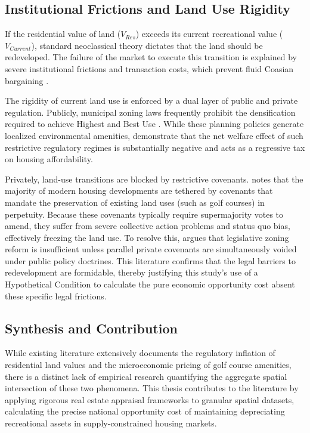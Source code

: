 \documentclass[10pt, letterpaper]{article}
\begin{document}
\subsection{Institutional Frictions and Land Use Rigidity}
If the residential value of land ($V_{Res}$) exceeds its current recreational value ($V_{Current}$), standard neoclassical theory dictates that the land should be redeveloped. The failure of the market to execute this transition is explained by severe institutional frictions and transaction costs, which prevent fluid Coasian bargaining \parencite{Coase1960}. 

The rigidity of current land use is enforced by a dual layer of public and private regulation. Publicly, municipal zoning laws frequently prohibit the densification required to achieve Highest and Best Use \parencite{Fischel2015}. While these planning policies generate localized environmental amenities, \textcite{Cheshire2002} demonstrate that the net welfare effect of such restrictive regulatory regimes is substantially negative and acts as a regressive tax on housing affordability. 

Privately, land-use transitions are blocked by restrictive covenants. \textcite{Ellickson2022} notes that the majority of modern housing developments are tethered by covenants that mandate the preservation of existing land uses (such as golf courses) in perpetuity. Because these covenants typically require supermajority votes to amend, they suffer from severe collective action problems and status quo bias, effectively freezing the land use. To resolve this, \textcite{Korngold2024} argues that legislative zoning reform is insufficient unless parallel private covenants are simultaneously voided under public policy doctrines. This literature confirms that the legal barriers to redevelopment are formidable, thereby justifying this study's use of a Hypothetical Condition to calculate the pure economic opportunity cost absent these specific legal frictions.

\subsection{Synthesis and Contribution}
While existing literature extensively documents the regulatory inflation of residential land values and the microeconomic pricing of golf course amenities, there is a distinct lack of empirical research quantifying the aggregate spatial intersection of these two phenomena. This thesis contributes to the literature by applying rigorous real estate appraisal frameworks \parencite{AppraisalInstitute2020} to granular spatial datasets, calculating the precise national opportunity cost of maintaining depreciating recreational assets in supply-constrained housing markets.
\end{document}
